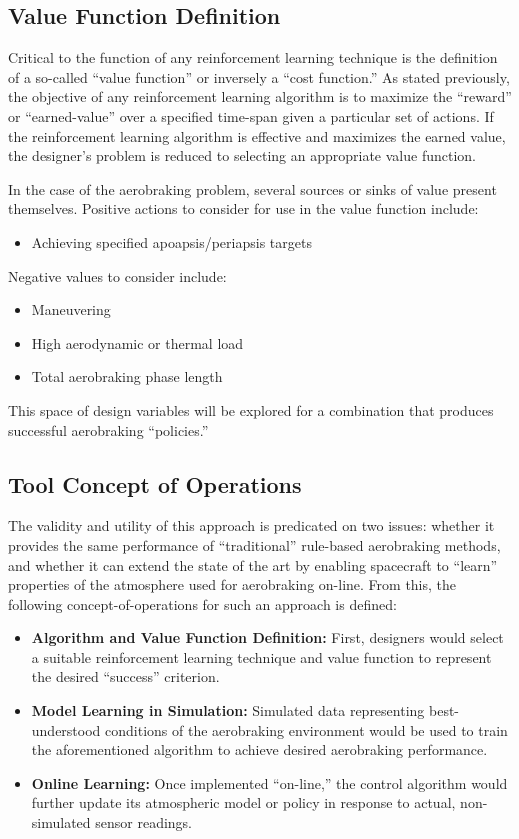 \documentclass[paper,11pt]{AAS}		%
\begin{document}
\subsection{Value Function Definition}
Critical to the function of any reinforcement learning technique is the definition of a so-called ``value function'' or 
inversely a ``cost function.'' As stated previously, the objective of any reinforcement learning algorithm is to maximize the 
``reward'' or ``earned-value'' over a specified time-span given a particular set of actions. If the reinforcement learning 
algorithm is effective and maximizes the earned value, the designer's problem is reduced to selecting an appropriate value 
function.

In the case of the aerobraking problem, several sources or sinks of value present themselves. Positive actions to consider for 
use in the value function include:
\begin{itemize}
	\item Achieving specified apoapsis/periapsis targets
\end{itemize}

Negative values to consider include:
\begin{itemize}
	\item Maneuvering
	\item High aerodynamic or thermal load
	\item Total aerobraking phase length
\end{itemize}

This space of design variables will be explored for a combination that produces successful aerobraking ``policies.'' 

\subsection{Tool Concept of Operations}

The validity and utility of this approach is predicated on two issues: whether it provides the same performance of 
``traditional'' rule-based aerobraking methods, and whether it can extend the state of the art by enabling spacecraft to 
``learn'' properties of the atmosphere used for aerobraking on-line. From this, the following concept-of-operations for such an 
approach is defined:

\begin{itemize}
	\item \textbf{Algorithm and Value Function Definition:} First, designers would select a suitable reinforcement learning 
	technique and value function to represent the desired ``success'' criterion.
	\item \textbf{Model Learning in Simulation:} Simulated data representing best-understood conditions of the aerobraking 
	environment would be used to train the aforementioned algorithm to achieve desired aerobraking performance.
	\item \textbf{Online Learning:} Once implemented ``on-line,'' the control algorithm would further update its atmospheric 
	model or policy in response to actual, non-simulated sensor readings. 
\end{itemize}
\end{document}
